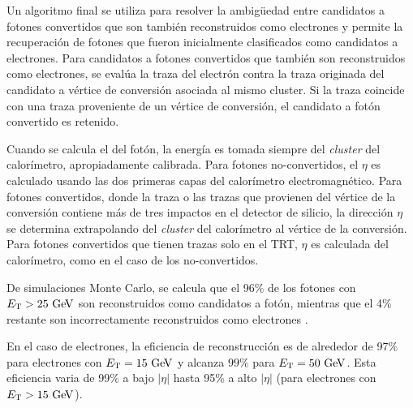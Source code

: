 Un algoritmo final \cite{Delmastro:1747242} se utiliza para resolver la
ambigüedad entre candidatos a fotones convertidos que son también reconstruidos
como electrones y permite la recuperación de fotones que fueron inicialmente
clasificados como candidatos a electrones.
Para candidatos a fotones convertidos que también son reconstruidos como
electrones, se evalúa la traza del electrón contra la traza originada del
candidato a vértice de conversión asociada al mismo cluster. Si la traza
coincide con una traza proveniente de un vértice de conversión, el candidato a
fotón convertido es retenido.


Cuando se calcula el {\pt} del fotón, la energía es tomada siempre del \emph{cluster}
del calorímetro, apropiadamente calibrada\cite{Banfi:1259219}. Para fotones
no-convertidos, el $\eta$ es calculado usando las dos primeras capas del
calorímetro electromagnético. Para fotones convertidos, donde la traza o las
trazas que provienen del vértice de la conversión contiene más de tres impactos en
el detector de silicio, la dirección $\eta$ se determina extrapolando del
\emph{cluster} del calorímetro al vértice de la conversión. Para fotones convertidos
que tienen trazas solo en el TRT, $\eta$ es calculada del calorímetro, %
como en el caso de los no-convertidos.

De simulaciones Monte Carlo, se calcula que el 96\% de los fotones con
$\et>25\gev$ son reconstruidos como candidatos a fotón, mientras que el 4\%
restante son incorrectamente reconstruidos como electrones \cite{Delmastro:1747242}.

En el caso de electrones, la eficiencia de reconstrucción es de alrededor de
97\% para electrones con $\et=15 \gev$ y alcanza $99 \%$ para $\et=50\gev$. Esta
eficiencia varia de 99\% a bajo $|\eta|$ hasta 95\% a alto $|\eta|$ (para
electrones con $\et>15 \gev$)\cite{ATLAS-CONF-2014-032}.


